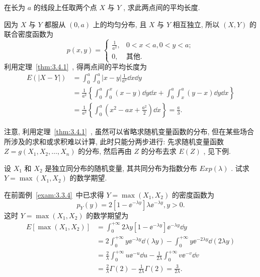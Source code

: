   \begin{example}\label{exam:3.4.1}
  	在长为 $a$ 的线段上任取两个点 $X$ 与 $Y$ , 求此两点间的平均长度.
  	\begin{solution}
  		因为 $X$ 与 $Y$ 都服从 $(0,a)$ 上的均匀分布, 且 $X$ 与 $Y$ 相互独立, 所以 $(X,Y)$ 的联合密度函数为
  		\begin{equation*}
  			p(x,y)=\begin{cases}
  			\frac{1}{a^2}, & 0<x<a,0<y<a;\\
  			0, & \text{其他}.
  			\end{cases}
  		\end{equation*}
  		利用定理~\ref{thm:3.4.1}~, 得两点间的平均长度为
  		\begin{align*}
  			E(|X-Y|)&=\int_{0}^{a}\int_{0}^{a}|x-y|\frac{1}{a^2}\dd x\dd y\\
  			&=\frac{1}{a^2}\left\{\int_{0}^{a}\int_{0}^{x}(x-y)\dd y\dd x+\int_{0}^{a}\int_{x}^{a}(y-x)\dd y\dd x\right\}\\
  			&=\frac{1}{a^2}\left\{\int_{0}^{a}\left(x^2-ax+\frac{a^2}{2} \right)\dd x \right\}=\frac{a}{3}.
  		\end{align*}
  	\end{solution}
  注意, 利用定理~\ref{thm:3.4.1}~, 虽然可以省略求随机变量函数的分布, 但在某些场合所涉及的求和或求积难以计算, 此时只能分两步进行: 先求随机变量函数 $Z=g(X_1,X_2,\ldots,X_n)$ 的分布, 然后再由 $Z$ 的分布去求 $E(Z)$ , 见下例.
  \end{example}
  \begin{example}\label{exam:3.4.2}
  	设 $X_1$ 和 $X_2$ 是独立同分布的随机变量, 其共同分布为指数分布 $Exp(\lambda)$ . 试求 $Y=\max(X_1,X_2)$ 的数学期望.
  	\begin{solution}
  		在前面例~\ref{exam:3.3.4}~中已求得 $Y=\max(X_1,X_2)$ 的密度函数为
  		\begin{equation*}
  			p_{Y}(y)=2\left[1-\ee^{-\lambda y}\right]\lambda\ee^{-\lambda y},y>0.
  		\end{equation*}
  		这时 $Y=\max \left(X_{1}, X_{2}\right)$ 的数学期望为
  		\begin{align*}
  			E[\max(X_1,X_2)]&=\int_{0}^{+\infty}2\lambda y\left[ 1-\ee^{-\lambda y} \right]\ee^{-\lambda y}\dd y\\
  			&=2\int_{0}^{+\infty}y\ee^{-\lambda y}\dd(\lambda y)-\int_{0}^{+\infty}y\ee^{-2\lambda y}\dd(2\lambda y)\\
  			&=\frac{2}{\lambda}\int_{0}^{+\infty}u\ee^{-u}\dd u-\frac{1}{2\lambda}\int_{0}^{+\infty}v\ee^{-v}\dd v\\
  			&=\frac{2}{\lambda}\Gamma(2)-\frac{1}{2\lambda}\Gamma(2)=\frac{3}{2\lambda}.
  		\end{align*}
  	\end{solution}
  \end{example}
